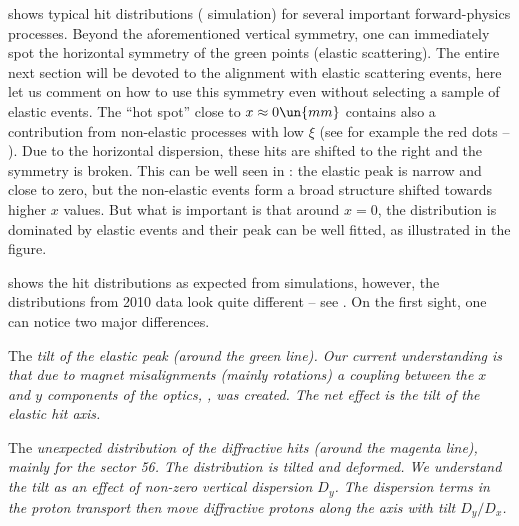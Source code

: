  shows typical hit distributions ( simulation) for several important forward-physics processes. Beyond the aforementioned vertical symmetry, one can immediately spot the horizontal symmetry of the green points (elastic scattering). The entire next section  will be devoted to the alignment with elastic scattering events, here let us comment on how to use this symmetry even without selecting a sample of elastic events. The ``hot spot'' close to $x\approx 0\un{mm}$ contains also a contribution from non-elastic processes with low $\xi$ (see for example the red dots -- ). Due to the horizontal dispersion, these hits are shifted to the right and the symmetry is broken. This can be well seen in : the elastic peak is narrow and close to zero, but the non-elastic events form a broad structure shifted towards higher $x$ values. But what is important is that around $x=0$, the distribution is dominated by elastic events and their peak can be well fitted, as illustrated in the figure.


 shows the hit distributions as expected from simulations, however, the distributions from 2010 data look quite different -- see . On the first sight, one can notice two major differences.

\> The \em{tilt of the elastic peak} (around the green line). Our current understanding is that due to  magnet misalignments (mainly rotations) a coupling between the $x$ and $y$ components of the optics, , was created. The net effect is the tilt of the elastic hit axis.

\> The \em{unexpected distribution of the diffractive hits} (around the magenta line), mainly for the sector 56. The distribution is tilted and deformed. We understand the tilt as an effect of non-zero vertical dispersion $D_y$. The dispersion terms in the proton transport  then move diffractive protons along the axis with tilt $D_y/D_x$.


